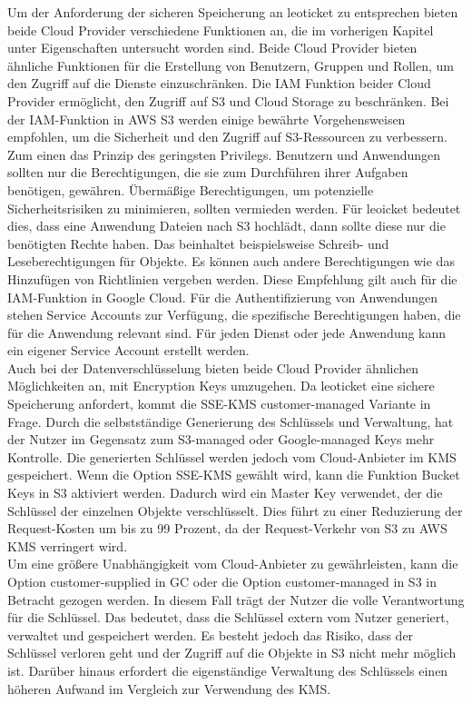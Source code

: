 Um der Anforderung der sicheren Speicherung an leoticket zu entsprechen bieten beide Cloud Provider verschiedene Funktionen an, die im vorherigen Kapitel unter Eigenschaften untersucht worden sind. Beide Cloud Provider bieten ähnliche Funktionen für die Erstellung von Benutzern, Gruppen und Rollen, um den Zugriff auf die Dienste einzuschränken. Die IAM Funktion beider Cloud Provider ermöglicht, den Zugriff auf S3 und Cloud Storage zu beschränken. Bei der IAM-Funktion in AWS S3 werden einige bewährte Vorgehensweisen empfohlen, um die Sicherheit und den Zugriff auf S3-Ressourcen zu verbessern. Zum einen das Prinzip des geringsten Privilegs. Benutzern und Anwendungen sollten nur die Berechtigungen, die sie zum Durchführen ihrer Aufgaben benötigen, gewähren. Übermäßige Berechtigungen, um potenzielle Sicherheitsrisiken zu minimieren, sollten vermieden werden. Für leoicket bedeutet dies, dass eine Anwendung Dateien nach S3 hochlädt, dann sollte diese nur die benötigten Rechte haben. Das beinhaltet beispielsweise Schreib- und Leseberechtigungen für Objekte. Es können auch andere Berechtigungen wie das Hinzufügen von Richtlinien vergeben werden. Diese Empfehlung gilt auch für die IAM-Funktion in Google Cloud. Für die Authentifizierung von Anwendungen stehen Service Accounts zur Verfügung, die spezifische Berechtigungen haben, die für die Anwendung relevant sind. Für jeden Dienst oder jede Anwendung kann ein eigener Service Account erstellt werden.\\

Auch bei der Datenverschlüsselung bieten beide Cloud Provider ähnlichen Möglichkeiten an, mit Encryption Keys umzugehen. Da leoticket eine sichere Speicherung anfordert, kommt die SSE-KMS customer-managed Variante in Frage. Durch die selbstständige Generierung des Schlüssels und Verwaltung, hat der Nutzer im Gegensatz zum S3-managed oder Google-managed Keys mehr Kontrolle. Die generierten Schlüssel werden jedoch vom Cloud-Anbieter im KMS gespeichert. Wenn die Option SSE-KMS gewählt wird, kann die Funktion Bucket Keys in S3 aktiviert werden. Dadurch wird ein Master Key verwendet, der die Schlüssel der einzelnen Objekte verschlüsselt. Dies führt zu einer Reduzierung der Request-Kosten um bis zu 99 Prozent, da der Request-Verkehr von S3 zu AWS KMS verringert wird.\\

Um eine größere Unabhängigkeit vom Cloud-Anbieter zu gewährleisten, kann die Option customer-supplied in GC oder die Option customer-managed in S3 in Betracht gezogen werden. In diesem Fall trägt der Nutzer die volle Verantwortung für die Schlüssel. Das bedeutet, dass die Schlüssel extern vom Nutzer generiert, verwaltet und gespeichert werden. Es besteht jedoch das Risiko, dass der Schlüssel verloren geht und der Zugriff auf die Objekte in S3 nicht mehr möglich ist. Darüber hinaus erfordert die eigenständige Verwaltung des Schlüssels einen höheren Aufwand im Vergleich zur Verwendung des KMS.\\

